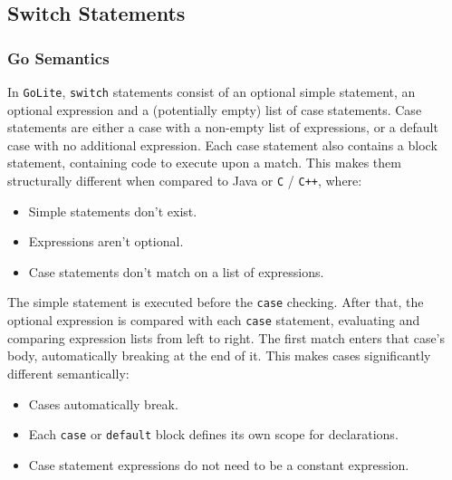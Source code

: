 \documentclass[11pt]{article}
\begin{document}
\subsection{Switch Statements}
\label{sec:orge8e4d90}
\subsubsection{Go Semantics}
\label{sec:orgc959d88}
In \texttt{GoLite}, \texttt{switch} statements consist of an optional simple
statement, an optional expression and a (potentially empty) list
of case statements. Case statements are either a case with a
non-empty list of expressions, or a default case with no additional expression.
Each case statement also contains a block statement, containing code to execute
upon a match. This makes
them structurally different when compared to Java or \texttt{C} / \texttt{C++}, where:
\begin{itemize}[noitemsep]
\item Simple statements don't exist.
\item Expressions aren't optional.
\item Case statements don't match on a list of expressions.
\end{itemize}
The simple statement is executed before the \texttt{case} checking.
After that, the optional expression is compared with each \texttt{case}
statement, evaluating and comparing expression lists from left to
right. The first match enters that case's body, automatically
breaking at the end of it. This makes cases significantly different
semantically:
\begin{itemize}[noitemsep]
\item Cases automatically break.
\item Each \texttt{case} or \texttt{default} block defines its own scope for declarations.
\item Case statement expressions do not need to be a constant expression.
\end{itemize}
\end{document}
